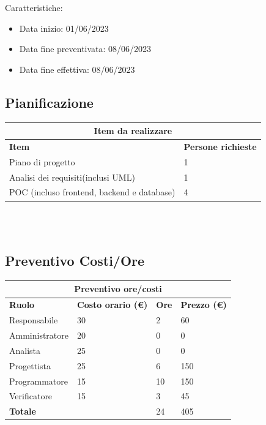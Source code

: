 \documentclass[12pt]{article}
\begin{document}
Caratteristiche:
\begin{itemize}
    \item Data inizio: 01/06/2023
    \item Data fine preventivata: 08/06/2023
    \item Data fine effettiva: 08/06/2023
\end{itemize}
\subsection{Pianificazione}
\begin{center}
    \begin{tabularx}{\textwidth}{|X|X|}
        \hline
        \multicolumn{2}{|c|}{\textbf{Item da realizzare}}\\
        \hline
        \hline
        \textbf{Item} & \textbf{Persone richieste}\\
        \hline
        Piano di progetto & 1\\
        \hline
        Analisi dei requisiti(inclusi UML) & 1 \\
        \hline
        POC (incluso frontend, backend e database) & 4 \\
        \hline
    \end{tabularx}\\[8pt]
    \mbox{}\\
\end{center}
\subsection{Preventivo Costi/Ore}
\begin{center}
    \begin{tabularx}{\textwidth}{|X|X|X|X|}
        \hline
        \multicolumn{4}{|c|}{\textbf{Preventivo ore/costi}}\\
        \hline
        \hline
        \textbf{Ruolo} & \textbf{Costo orario (\euro)} & \textbf{Ore} & \textbf{Prezzo (\euro)}\\
        \hline
        Responsabile    & 30 & 2 & 60\\   
        \hline
        Amministratore  & 20 & 0  & 0\\ 
        \hline
        Analista        & 25 & 0  & 0\\ 
        \hline
        Progettista     & 25 & 6  & 150\\
        \hline
        Programmatore   & 15 & 10  & 150\\
        \hline
        Verificatore    & 15 & 3  & 45\\
        \hline
        \textbf{Totale} &    & 24 & 405\\
        \hline
    \end{tabularx}\\[8pt]
    \mbox{}\\
\end{center}
\end{document}

